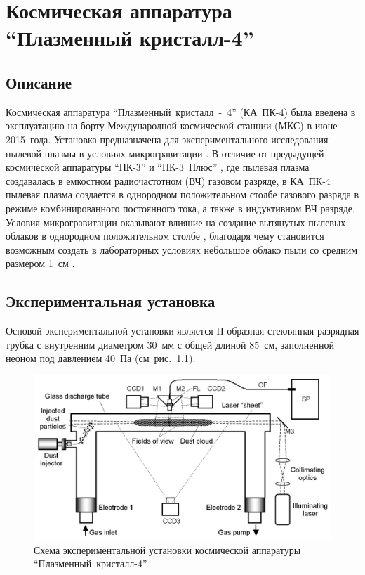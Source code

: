 \chapter{Космическая аппаратура “Плазменный кристалл-4”}
\label{cha:ch_3}
\section{Описание}
\label{sec:sec_31}
Космическая аппаратура “Плазменный~кристалл~-~4” (КА~ПК-4) была введена в эксплуатацию на борту
Международной космической станции (МКС) в июне 2015~года. Установка предназначена для экспериментального
исследования пылевой плазмы в условиях микрогравитации \cite{Pustylnik}. В отличие от предыдущей космической аппаратуры
“ПК-3” \cite{Nefedov} и “ПК-3~Плюс” \cite{Thomas}, где пылевая плазма создавалась в емкостном радиочастотном (ВЧ) газовом разряде,
в КА~ПК-4 пылевая плазма создается в однородном положительном столбе газового разряда в режиме
комбинированного постоянного тока, а также в индуктивном ВЧ разряде. Условия микрогравитации оказывают
влияние на создание вытянутых пылевых облаков в однородном положительном столбе \cite{Usachev},
благодаря чему становится возможным создать в лабораторных условиях небольшое облако пыли со средним размером 1~см \cite{Fortov}.

\section{Экспериментальная установка}
Основой экспериментальной установки является П-образная стеклянная разрядная трубка с внутренним диаметром 30~мм
с общей длиной 85~см, заполненной неоном под давлением 40~Па (см~рис.~\ref{fig:fig31}).

\begin{figure}
  \centering
  \includegraphics[width=12cm]{figures/fig31}
  \caption{Схема экспериментальной установки космической аппаратуры “Плазменный~кристалл-4”.}
  \label{fig:fig31}
\end{figure}

